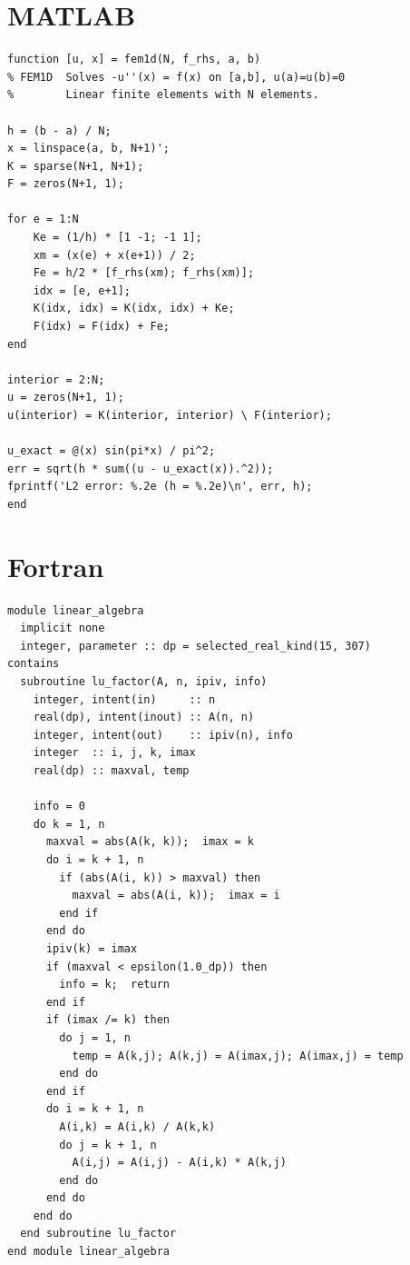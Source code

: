\section{MATLAB}

\begin{lstlisting}[style=matlab, caption={Elementos finitos 1D}]
function [u, x] = fem1d(N, f_rhs, a, b)
% FEM1D  Solves -u''(x) = f(x) on [a,b], u(a)=u(b)=0
%        Linear finite elements with N elements.

h = (b - a) / N;
x = linspace(a, b, N+1)';
K = sparse(N+1, N+1);
F = zeros(N+1, 1);

for e = 1:N
    Ke = (1/h) * [1 -1; -1 1];
    xm = (x(e) + x(e+1)) / 2;
    Fe = h/2 * [f_rhs(xm); f_rhs(xm)];
    idx = [e, e+1];
    K(idx, idx) = K(idx, idx) + Ke;
    F(idx) = F(idx) + Fe;
end

interior = 2:N;
u = zeros(N+1, 1);
u(interior) = K(interior, interior) \ F(interior);

u_exact = @(x) sin(pi*x) / pi^2;
err = sqrt(h * sum((u - u_exact(x)).^2));
fprintf('L2 error: %.2e (h = %.2e)\n', err, h);
end
\end{lstlisting}

\section{Fortran}

\begin{lstlisting}[style=fortran, caption={Factorización LU con pivoteo parcial}]
module linear_algebra
  implicit none
  integer, parameter :: dp = selected_real_kind(15, 307)
contains
  subroutine lu_factor(A, n, ipiv, info)
    integer, intent(in)     :: n
    real(dp), intent(inout) :: A(n, n)
    integer, intent(out)    :: ipiv(n), info
    integer  :: i, j, k, imax
    real(dp) :: maxval, temp

    info = 0
    do k = 1, n
      maxval = abs(A(k, k));  imax = k
      do i = k + 1, n
        if (abs(A(i, k)) > maxval) then
          maxval = abs(A(i, k));  imax = i
        end if
      end do
      ipiv(k) = imax
      if (maxval < epsilon(1.0_dp)) then
        info = k;  return
      end if
      if (imax /= k) then
        do j = 1, n
          temp = A(k,j); A(k,j) = A(imax,j); A(imax,j) = temp
        end do
      end if
      do i = k + 1, n
        A(i,k) = A(i,k) / A(k,k)
        do j = k + 1, n
          A(i,j) = A(i,j) - A(i,k) * A(k,j)
        end do
      end do
    end do
  end subroutine lu_factor
end module linear_algebra
\end{lstlisting}


